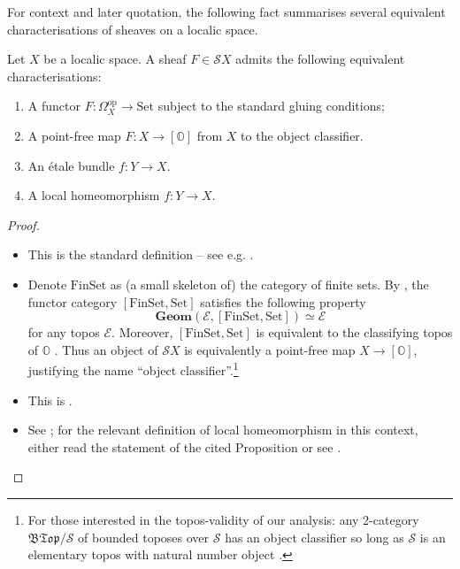 \documentclass[a4paper, 11pt,reqno]{amsart}
\newcommand{\Set}{\mathrm{Set}}
\newcommand{\opp}{\mathrm{op}}    %
\newcommand{\baseS}{\mathcal{S}}
\newcommand{\E}{\mathcal{E}}
\newcommand{\OC}{{{[\mathbb{O}]}}}
\begin{document}
For context and later quotation, the following fact summarises several equivalent characterisations of sheaves on a localic space. 

\begin{fact}\label{fact:sheaves} Let $X$ be a localic space. A sheaf $F\in\baseS X$ admits the following equivalent characterisations:
	\begin{enumerate}[label=(\roman*)]
		\item A functor $F\colon \Omega_X^{\opp}\to \Set$ subject to the standard gluing conditions; %
		\item A  point-free map $F\colon X\to \OC$ from $X$ to the object classifier.
		\item An \'{e}tale bundle $f\colon Y\to X$.
		\item A local homeomorphism $f\colon Y\to X$.
	\end{enumerate}
\end{fact}
\begin{proof} \hfill 
	\begin{itemize}
		\item[(i):] This is the standard definition -- see e.g. \cite[Example A.2.1.8]{Elephant}.
		\item[(i)$\iff$ (ii):] 	Denote $\mathrm{FinSet}$ as (a small skeleton of) the category of finite sets. By  \cite[Example B3.2.9]{Elephant}, the functor category $[\mathrm{FinSet},\Set]$ satisfies the following property
		\[\textbf{Geom}(\E, [\mathrm{FinSet},\Set])\simeq \E\]
		for any topos $\E$. Moreover, $[\mathrm{FinSet},\Set]$ is equivalent to the classifying topos of $\mathbb{O}$ \cite[Example 1.74]{Vi07}. Thus an object of $\baseS X$ is equivalently a point-free map $X\to[\mathbb{O}]$, justifying the name ``object classifier''.\footnote{For those interested in the topos-validity of our analysis: any 2-category $\mathfrak{BTop}/\baseS$ of bounded toposes over $\baseS$ has an object classifier so long as $\baseS$ is an elementary topos with natural number object \cite[Theorem B4.2.11]{Elephant}.}
		\item[(i)$\iff$ (iii):] This is \cite[Proposition VI.3.3]{JoyalTierney}.
			\item[(iii)$\iff$ (iv):] See \cite[Proposition 1.49]{Vi07}; for the relevant definition of local homeomorphism in this context, either read the statement of the cited Proposition or see \cite[C1.5]{Elephant}. 
	\end{itemize}
\end{proof}
\end{document}
